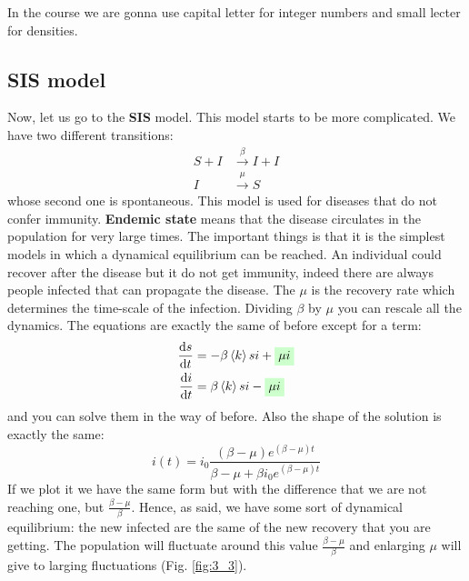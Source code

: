 \documentclass[../main/main.tex]{subfiles}
\begin{document}
\begin{remark}
In the course we are gonna use capital letter for integer numbers and small lecter for densities.
\end{remark}

\subsection{SIS model}
Now, let us go to the \textbf{SIS} model. This model starts to be more complicated. We have two different transitions:
\begin{equation}
\begin{split}
  S + I &\overset{\beta }{\rightarrow } I + I \\
  I &\overset{\mu }{\rightarrow } S
\end{split}
\end{equation}
whose second one is spontaneous.
This model is used for diseases that do not confer immunity. \textbf{Endemic state} means that the disease circulates in the population for very large times.
The important things is that it is the simplest models in which a dynamical equilibrium can be reached. An individual could recover after the disease but it do not get immunity, indeed there are always people infected that can propagate the disease. The \( \mu  \) is the recovery rate which determines the time-scale of the infection.
Dividing \( \beta  \) by \( \mu  \) you can rescale all the dynamics.
The equations are exactly the same of before except for a term:
\begin{equation}
\begin{split}
  \dv{s}{t} &= - \beta \expval{k} si + \mathcolorbox{green!20}{\mu i}  \\
  \dv{i}{t} &= \beta \expval{k} si - \mathcolorbox{green!20}{\mu i}
\end{split}
\end{equation}
and you can solve them in the way of before.
Also the shape of the solution is exactly the same:
\begin{equation}
  i(t) = i_0 \frac{(\beta - \mu ) e^{(\beta - \mu )t} }{\beta - \mu  + \beta i_0 e^{(\beta - \mu )t} }
\end{equation}
If we plot it we have the same form but with the difference that we are not reaching one, but \( \frac{\beta - \mu }{\beta } \). Hence, as said, we have some sort of dynamical equilibrium: the new infected are the same of the new recovery that you are getting. The population will fluctuate around this value \( \frac{\beta - \mu }{\beta } \) and enlarging \( \mu  \) will give to larging fluctuations (Fig. \ref{fig:3_3}).
\end{document}
